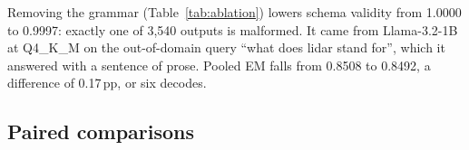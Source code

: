 \documentclass[a4paper,fleqn]{cas-dc}
\newcommand{\pp}{\,pp}
\newcommand{\QF}{Q4\_K\_M}
\begin{document}
Removing the grammar (Table~\ref{tab:ablation}) lowers schema validity from 1.0000 to 0.9997:
exactly one of 3,540 outputs is malformed. It came from Llama-3.2-1B at \QF{} on the
out-of-domain query ``what does lidar stand for'', which it answered with a sentence of prose.
Pooled EM falls from 0.8508 to 0.8492, a difference of 0.17\pp{}, or six decodes.

\subsection{Paired comparisons}
\label{sec:res-paired}
\end{document}
